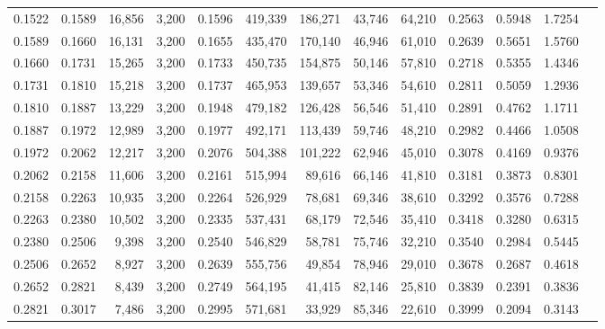 \begin{tabular}{rrrrrrrrrrrrr}
0.1522 & 0.1589 & 16,856 & 3,200 &                                     0.1596 & 419,339 & 186,271 &  43,746 &  64,210 & 0.2563 & 0.5948 & 1.7254 \\
0.1589 & 0.1660 & 16,131 & 3,200 &                                     0.1655 & 435,470 & 170,140 &  46,946 &  61,010 & 0.2639 & 0.5651 & 1.5760 \\
0.1660 & 0.1731 & 15,265 & 3,200 &                                     0.1733 & 450,735 & 154,875 &  50,146 &  57,810 & 0.2718 & 0.5355 & 1.4346 \\
0.1731 & 0.1810 & 15,218 & 3,200 &                                     0.1737 & 465,953 & 139,657 &  53,346 &  54,610 & 0.2811 & 0.5059 & 1.2936 \\
0.1810 & 0.1887 & 13,229 & 3,200 &                                     0.1948 & 479,182 & 126,428 &  56,546 &  51,410 & 0.2891 & 0.4762 & 1.1711 \\
0.1887 & 0.1972 & 12,989 & 3,200 &                                     0.1977 & 492,171 & 113,439 &  59,746 &  48,210 & 0.2982 & 0.4466 & 1.0508 \\
0.1972 & 0.2062 & 12,217 & 3,200 &                                     0.2076 & 504,388 & 101,222 &  62,946 &  45,010 & 0.3078 & 0.4169 & 0.9376 \\
0.2062 & 0.2158 & 11,606 & 3,200 &                                     0.2161 & 515,994 &  89,616 &  66,146 &  41,810 & 0.3181 & 0.3873 & 0.8301 \\
0.2158 & 0.2263 & 10,935 & 3,200 &                                     0.2264 & 526,929 &  78,681 &  69,346 &  38,610 & 0.3292 & 0.3576 & 0.7288 \\
0.2263 & 0.2380 & 10,502 & 3,200 &                                     0.2335 & 537,431 &  68,179 &  72,546 &  35,410 & 0.3418 & 0.3280 & 0.6315 \\
0.2380 & 0.2506 &  9,398 & 3,200 &                                     0.2540 & 546,829 &  58,781 &  75,746 &  32,210 & 0.3540 & 0.2984 & 0.5445 \\
0.2506 & 0.2652 &  8,927 & 3,200 &                                     0.2639 & 555,756 &  49,854 &  78,946 &  29,010 & 0.3678 & 0.2687 & 0.4618 \\
0.2652 & 0.2821 &  8,439 & 3,200 &                                     0.2749 & 564,195 &  41,415 &  82,146 &  25,810 & 0.3839 & 0.2391 & 0.3836 \\
0.2821 & 0.3017 &  7,486 & 3,200 &                                     0.2995 & 571,681 &  33,929 &  85,346 &  22,610 & 0.3999 & 0.2094 & 0.3143 \\

\end{tabular}
